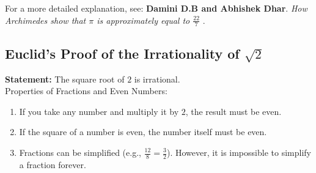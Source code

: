 \documentclass[12pt]{article}
\begin{document}
\noindent For a more detailed explanation, see: \textbf{Damini D.B and Abhishek Dhar}. \textit{How Archimedes show that $\pi$ is approximately equal to $\frac{22}{7}$} \cite{b2020archimedesshowedpiapproximately}. 


\subsection{Euclid's Proof of the Irrationality of $\sqrt{2}$}

\noindent \textbf{Statement:} The square root of $2$ is irrational.\\

\noindent Properties of Fractions and Even Numbers:
\begin{enumerate}
    \item If you take any number and multiply it by $2$, the result must be even.
    \item If the square of a number is even, the number itself must be even.
    \item Fractions can be simplified (e.g., $\frac{12}{8} = \frac{3}{2}$). However, it is impossible to simplify a fraction forever.
\end{enumerate}
\end{document}
